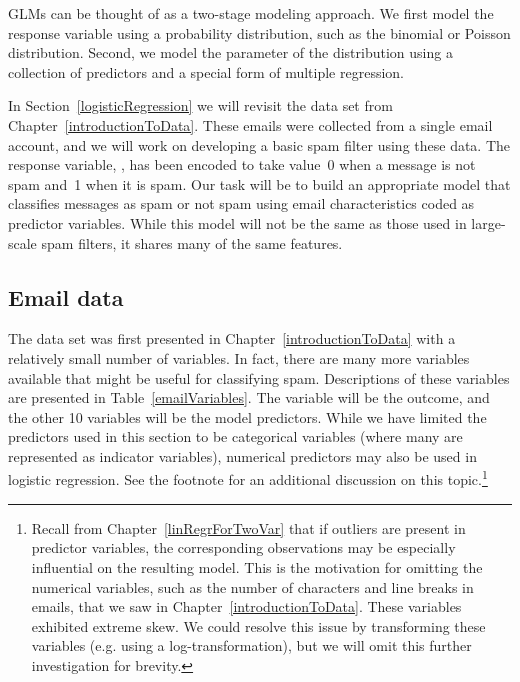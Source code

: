 GLMs can be thought of as a two-stage modeling approach. We first model the response variable using a probability distribution, such as the binomial or Poisson distribution. Second, we model the parameter of the distribution using a collection of predictors and a special form of multiple regression.


In Section~\ref{logisticRegression} we will revisit the  data set from Chapter~\ref{introductionToData}. These emails were collected from a single email account, and we will work on developing a basic spam filter using these data. The response variable, , has been encoded to take value~0 when a message is not spam and~1 when it is spam. Our task will be to build an appropriate model that classifies messages as spam or not spam using email characteristics coded as predictor variables. While this model will not be the same as those used in large-scale spam filters, it shares many of the same features. 

\subsection{Email data}

The  data set was first presented in Chapter~\ref{introductionToData} with a relatively small number of variables. In fact, there are many more variables available that might be useful for classifying spam. Descriptions of these variables are presented in Table~\ref{emailVariables}. The  variable will be the outcome, and the other 10 variables will be the model predictors. While we have limited the predictors used in this section to be categorical variables (where many are represented as indicator variables), numerical predictors may also be used in logistic regression. See the footnote for an additional discussion on this topic.\footnote{Recall from Chapter~\ref{linRegrForTwoVar} that if outliers are present in predictor variables, the corresponding observations may be especially influential on the resulting model. This is the motivation for omitting the numerical variables, such as the number of characters and line breaks in emails, that we saw in Chapter~\ref{introductionToData}. These variables exhibited extreme skew. We could resolve this issue by transforming these variables (e.g. using a log-transformation), but we will omit this further investigation for brevity.}

